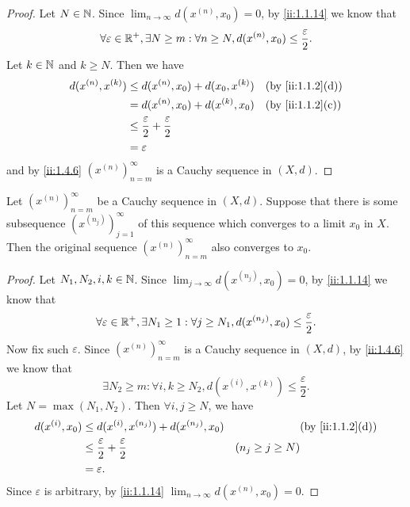 \begin{proof}
  Let \(N \in \mathbb{N}\).
  Since \(\lim_{n \to \infty} d(x^{(n)}, x_0) = 0\), by \cref{ii:1.1.14} we know that
  \[
    \forall \varepsilon \in \mathbb{R}^+, \exists N \geq m : \forall n \geq N, d(x^{(n)}, x_0) \leq \dfrac{\varepsilon}{2}.
  \]
  Let \(k \in \mathbb{N}\) and \(k \geq N\).
  Then we have
  \begin{align*}
    d(x^{(n)}, x^{(k)}) & \leq d(x^{(n)}, x_0) + d(x_0, x^{(k)})               &  & \by{ii:1.1.2}[d] \\
                        & = d(x^{(n)}, x_0) + d(x^{(k)}, x_0)                  &  & \by{ii:1.1.2}[c] \\
                        & \leq \dfrac{\varepsilon}{2} + \dfrac{\varepsilon}{2}                    \\
                        & = \varepsilon
  \end{align*}
  and by \cref{ii:1.4.6} \((x^{(n)})_{n = m}^\infty\) is a Cauchy sequence in \((X, d)\).
\end{proof}

\setcounter{thm}{8}
\begin{lem}\label{ii:1.4.9}
  Let \((x^{(n)})_{n = m}^\infty\) be a Cauchy sequence in \((X, d)\).
  Suppose that there is some subsequence \((x^{(n_j)})_{j = 1}^\infty\) of this sequence which converges to a limit \(x_0\) in \(X\).
  Then the original sequence \((x^{(n)})_{n = m}^\infty\) also converges to \(x_0\).
\end{lem}

\begin{proof}
  Let \(N_1, N_2, i, k \in \mathbb{N}\).
  Since \(\lim_{j \to \infty} d(x^{(n_j)}, x_0) = 0\), by \cref{ii:1.1.14} we know that
  \[
    \forall \varepsilon \in \mathbb{R}^+, \exists N_1 \geq 1 : \forall j \geq N_1, d(x^{(n_j)}, x_0) \leq \dfrac{\varepsilon}{2}.
  \]
  Now fix such \(\varepsilon\).
  Since \((x^{(n)})_{n = m}^\infty\) is a Cauchy sequence in \((X, d)\), by \cref{ii:1.4.6} we know that
  \[
    \exists N_2 \geq m : \forall i, k \geq N_2, d(x^{(i)}, x^{(k)}) \leq \dfrac{\varepsilon}{2}.
  \]
  Let \(N = \max(N_1, N_2)\).
  Then \(\forall i, j \geq N\), we have
  \begin{align*}
    d(x^{(i)}, x_0) & \leq d(x^{(i)}, x^{(n_j)}) + d(x^{(n_j)}, x_0)       &                     & \by{ii:1.1.2}[d] \\
                    & \leq \dfrac{\varepsilon}{2} + \dfrac{\varepsilon}{2} & (n_j \geq j \geq N)                 \\
                    & = \varepsilon.
  \end{align*}
  Since \(\varepsilon\) is arbitrary, by \cref{ii:1.1.14} \(\lim_{n \to \infty} d(x^{(n)}, x_0) = 0\).
\end{proof}

